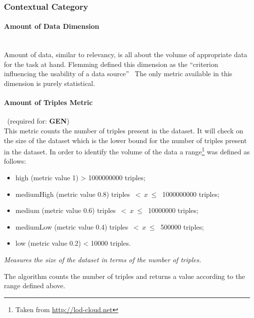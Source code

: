 \subsubsection{Contextual Category}
\label{sec:Contextual} 

\paragraph{Amount of Data Dimension}~\\ %
Amount of data, similar to relevancy, is all about the volume of appropriate data for the task at hand.
Flemming defined this dimension as the ``criterion influencing the usability of a data source''~\cite{Flemming2008}
The only metric available in this dimension is purely statistical.

\paragraph{Amount of Triples Metric}~(required for: \textbf{GEN})~\\ %
This metric counts the number of triples present in the dataset. 
It will check on the size of the dataset which is the lower bound for the number of triples present in the dataset.
In order to identify the volume of the data a range\footnote{Taken from \url{http://lod-cloud.net}} was defined as follows:
\begin{itemize}
\item high (metric value 1)\:  > 1000000000 triples;
\item mediumHigh (metric value 0.8) triples~$<~x~\leq~$ 1000000000 triples;
\item medium (metric value 0.6) triples~$<~x~\leq~$ 10000000 triples;
\item mediumLow (metric value 0.4) triples~$<~x~\leq~$ 500000 triples;
\item low (metric value 0.2)\: < 10000 triples.
\end{itemize}

\begin{mdframed}[style=metricdefinition]
\emph{Measures the size of the dataset in terms of the number of triples.}
\end{mdframed}

The algorithm counts the number of triples and returns a value according to the range defined above.